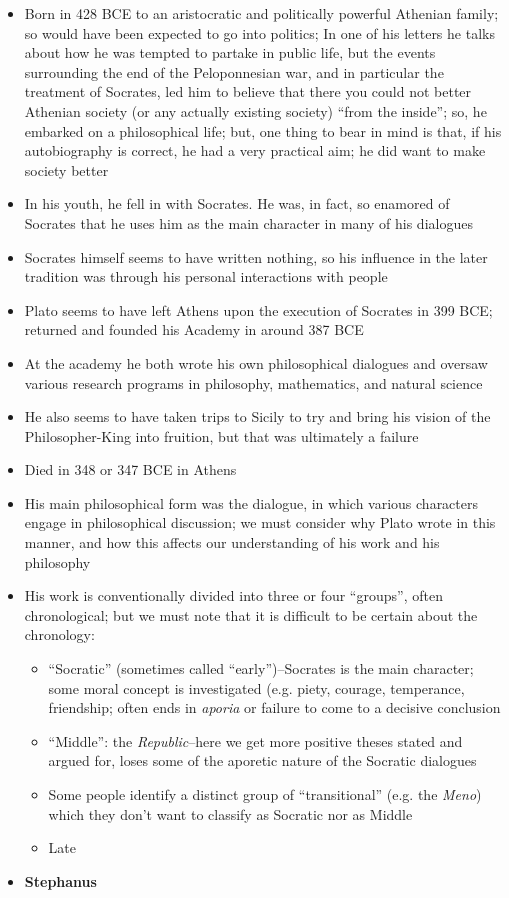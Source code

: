 \documentclass[11pt]{article}
\begin{document}
\begin{itemize}
\item{Born in 428 BCE to an aristocratic and politically powerful Athenian family; so would have been expected to go into politics; In one of his letters he talks about how he was tempted to partake in public life, but the events surrounding the end of the Peloponnesian war, and in particular the treatment of Socrates, led him to believe that there you could not better Athenian society (or any actually existing society) ``from the inside''; so, he embarked on a philosophical life; but, one thing to bear in mind is that, if his autobiography is correct, he had a very practical aim; he did want to make society better}\item{In his youth, he fell in with Socrates. He was, in fact, so enamored of Socrates that he uses him as the main character in many of his dialogues}\item{Socrates himself seems to have written nothing, so his influence in the later tradition was through his personal interactions with people}\item{Plato seems to have left Athens upon the execution of Socrates in 399 BCE; returned and founded his Academy in around 387 BCE}\item{At the academy he both wrote his own philosophical dialogues and oversaw various research programs in philosophy, mathematics, and natural science}\item{He also seems to have taken trips to Sicily to try and bring his vision of the Philosopher-King into fruition, but that was ultimately a failure}\item{Died in 348 or 347 BCE in Athens}\item{His main philosophical form was the dialogue, in which various characters engage in philosophical discussion; we must consider why Plato wrote in this manner, and how this affects our understanding of his work and his philosophy}\item{His work is conventionally divided into three or four ``groups'', often chronological; but we must note that it is difficult to be certain about the chronology:}\begin{itemize}\item{``Socratic'' (sometimes called ``early'')--Socrates is the main character; some moral concept is investigated (e.g. piety, courage, temperance, friendship; often ends in \emph{aporia} or failure to come to a decisive conclusion}\item{``Middle'': the \emph{Republic}--here we get more positive theses stated and argued for, loses some of the aporetic nature of the Socratic dialogues}\item{Some people identify a distinct group of ``transitional'' (e.g. the \emph{Meno}) which they don't want to classify as Socratic nor as Middle}\item{Late}\end{itemize}
\item{\textbf{Stephanus}}
\end{itemize}
\end{document}
